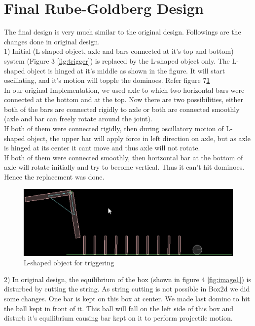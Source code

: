 \documentclass[a4paper,11pt]{article}
\begin{document}
\section{Final Rube-Goldberg Design}
{
\indent \indent The final design is very much similar to the original design. Followings are the changes done in original design. \\

1) Initial (L-shaped object, axle and bars connected at it's top and bottom) system (Figure 3 \ref{fig:trigger}) is replaced by the L-shaped object only. The L-shaped object is hinged at it's middle as shown in the figure. It will start oscillating, and it's motion will topple the dominoes. Refer figure 7\ref{fig:image4} \\
 In our original Implementation, we used axle to which two horizontal bars were connected at the bottom and at the top. Now there are two possibilities, either both of the bars are connected rigidly to axle or both are connected smoothly (axle and bar can freely rotate around the joint). \\
\indent If both of them were connected rigidly, then during oscillatory motion of L-shaped object, the upper bar will apply force in left direction on axle, but as axle is hinged at its center it cant move and thus axle will not rotate. \\
\indent If both of them were connected smoothly, then horizontal bar at the bottom of axle will rotate initially and try to become vertical. Thus it can't hit dominoes. Hence the replacement was done.

\begin{figure}[h]
    \centering
    \label{fig:image4}
    \includegraphics[scale=0.3]{images/image4}
    \caption{L-shaped object for triggering}
\end{figure}

2) In original design, the equilibrium of the box (shown in figure 4 \ref{fig:image1}) is disturbed by cutting the string. As string cutting is not possible in Box2d we did some changes. One bar is kept on this box at center. We made last domino to hit the ball kept in front of it. This ball will fall on the left side of this box and disturb it's equilibrium causing bar kept on it to perform projectile motion. 

}
\end{document}
